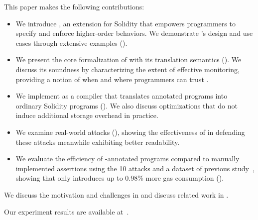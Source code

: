 This paper makes the following contributions:
\begin{itemize}[leftmargin=0.6cm, topsep=1.5pt]
  \item We introduce \lang, an extension for Solidity that empowers
        programmers to specify and enforce higher-order behaviors.
        We demonstrate \lang's design and use cases through extensive examples ().
  \item We present the core formalization of \lang with its translation semantics ().
        We discuss its soundness by characterizing the extent of effective monitoring,
        providing a notion of when and where programmers can trust \lang.
  \item We implement \lang as a compiler that translates annotated 
        programs into ordinary Solidity programs (). 
        We also discuss optimizations that do not induce additional storage overhead 
        in practice. %
  \item We examine \numCaseStudied real-world attacks (), showing the effectiveness of \lang
        in defending these attacks meanwhile exhibiting better readability.
  \item We evaluate the efficiency of \lang-annotated programs compared to manually 
        implemented assertions using the 10 attacks and a dataset of previous study~\cite{DBLP:conf/pldi/LiCL20}, 
        showing that \lang only introduces up to 0.98\% more gas consumption ().
        
\end{itemize}
We discuss the motivation and challenges in  and discuss
related work in .

 Our experiment results are available at~\cite{consolartifact}. 

